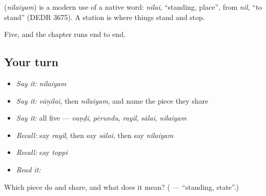 \begin{cousinweb}
\textbf{} (\emph{nilaiyam}) is a modern use of a native word: \emph{nilai}, \textquotedblleft{}standing, place\textquotedblright{}, from \emph{nil}, \textquotedblleft{}to stand\textquotedblright{} (DEDR 3675). A station is where things stand and stop.
\end{cousinweb}

\begin{grammarlens}[title={What you've built}]
Five, and the chapter runs end to end.
\end{grammarlens}

\subsection*{Your turn}
\begin{itemize}
\raggedright
  \item \emph{Say it:} \emph{nilaiyam}
  \item \emph{Say it:} \emph{vāṉilai}, then \emph{nilaiyam}, and name the piece they share
  \item \emph{Say it:} all five — \emph{vaṇḍi}, \emph{pērundu}, \emph{rayil}, \emph{sālai}, \emph{nilaiyam}
  \item \emph{Recall:} say \emph{rayil}, then say \emph{sālai}, then say \emph{nilaiyam}
  \item \emph{Recall:} say \emph{toppi}
  \item \emph{Read it:} \textbf{}
\end{itemize}

\begin{tcolorbox}[breakable,colback=teal!4,colframe=teal!35!black,title={Before you move on}]
Which piece do  and  share, and what does it mean? (\textbf{} — \textquotedblleft{}standing, state\textquotedblright{}.)
\end{tcolorbox}
